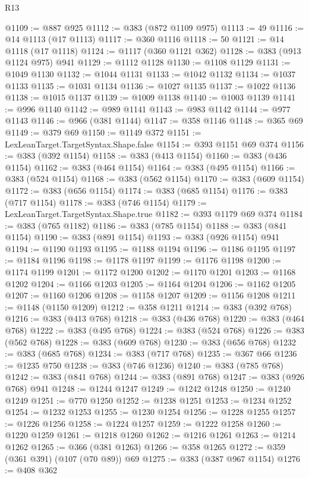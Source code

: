 \begin{lexlean}{R13}
\begin{coremodule}
@1109 := @887 @925
@1112 := @383 (@872 @1109 @975)
@1113 := 49
@1116 := @14 @1113 (@17 @1113)
@1117 := @360 @1116
@1118 := 50
@1121 := @14 @1118 (@17 @1118)
@1124 := @1117 (@360 @1121 @362)
@1128 := @383 (@913 @1124 @975) @941
@1129 := @1112 @1128
@1130 := @1108 @1129
@1131 := @1049 @1130
@1132 := @1044 @1131
@1133 := @1042 @1132
@1134 := @1037 @1133
@1135 := @1031 @1134
@1136 := @1027 @1135
@1137 := @1022 @1136
@1138 := @1015 @1137
@1139 := @1009 @1138
@1140 := @1003 @1139
@1141 := @996 @1140
@1142 := @989 @1141
@1143 := @983 @1142
@1144 := @977 @1143
@1146 := @966 (@381 @1144)
@1147 := @358 @1146
@1148 := @365 @69
@1149 := @379 @69
@1150 := @1149 @372
@1151 := LexLeanTarget.TargetSyntax.Shape.false
@1154 := @393 @1151 @69 @374
@1156 := @383 (@392 @1154)
@1158 := @383 (@413 @1154)
@1160 := @383 (@436 @1154)
@1162 := @383 (@464 @1154)
@1164 := @383 (@495 @1154)
@1166 := @383 (@524 @1154)
@1168 := @383 (@562 @1154)
@1170 := @383 (@609 @1154)
@1172 := @383 (@656 @1154)
@1174 := @383 (@685 @1154)
@1176 := @383 (@717 @1154)
@1178 := @383 (@746 @1154)
@1179 := LexLeanTarget.TargetSyntax.Shape.true
@1182 := @393 @1179 @69 @374
@1184 := @383 (@765 @1182)
@1186 := @383 (@785 @1154)
@1188 := @383 (@841 @1154)
@1190 := @383 (@891 @1154)
@1193 := @383 (@926 @1154) @941
@1194 := @1190 @1193
@1195 := @1188 @1194
@1196 := @1186 @1195
@1197 := @1184 @1196
@1198 := @1178 @1197
@1199 := @1176 @1198
@1200 := @1174 @1199
@1201 := @1172 @1200
@1202 := @1170 @1201
@1203 := @1168 @1202
@1204 := @1166 @1203
@1205 := @1164 @1204
@1206 := @1162 @1205
@1207 := @1160 @1206
@1208 := @1158 @1207
@1209 := @1156 @1208
@1211 := @1148 (@1150 @1209)
@1212 := @358 @1211
@1214 := @383 (@392 @768)
@1216 := @383 (@413 @768)
@1218 := @383 (@436 @768)
@1220 := @383 (@464 @768)
@1222 := @383 (@495 @768)
@1224 := @383 (@524 @768)
@1226 := @383 (@562 @768)
@1228 := @383 (@609 @768)
@1230 := @383 (@656 @768)
@1232 := @383 (@685 @768)
@1234 := @383 (@717 @768)
@1235 := @367 @66
@1236 := @1235 @750
@1238 := @383 (@746 @1236)
@1240 := @383 (@785 @768)
@1242 := @383 (@841 @768)
@1244 := @383 (@891 @768)
@1247 := @383 (@926 @768) @941
@1248 := @1244 @1247
@1249 := @1242 @1248
@1250 := @1240 @1249
@1251 := @770 @1250
@1252 := @1238 @1251
@1253 := @1234 @1252
@1254 := @1232 @1253
@1255 := @1230 @1254
@1256 := @1228 @1255
@1257 := @1226 @1256
@1258 := @1224 @1257
@1259 := @1222 @1258
@1260 := @1220 @1259
@1261 := @1218 @1260
@1262 := @1216 @1261
@1263 := @1214 @1262
@1265 := @366 (@381 @1263)
@1266 := @358 @1265
@1272 := @359 (@361 @391) (@107 (@70 @89)) @69
@1275 := @383 (@387 @967 @1154)
@1276 := @408 @362

\end{coremodule}
\end{lexlean}
